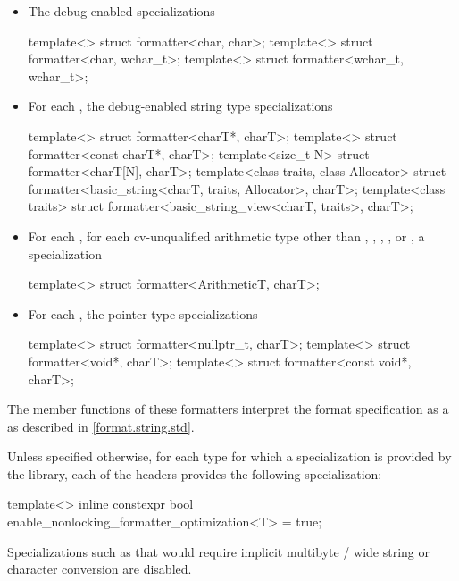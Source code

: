 \begin{itemize}
\item
{}%
The debug-enabled specializations
\begin{codeblock}
template<> struct formatter<char, char>;
template<> struct formatter<char, wchar_t>;
template<> struct formatter<wchar_t, wchar_t>;
\end{codeblock}

\item
{}%
For each ,
the debug-enabled string type specializations
\begin{codeblock}
template<> struct formatter<charT*, charT>;
template<> struct formatter<const charT*, charT>;
template<size_t N> struct formatter<charT[N], charT>;
template<class traits, class Allocator>
  struct formatter<basic_string<charT, traits, Allocator>, charT>;
template<class traits>
  struct formatter<basic_string_view<charT, traits>, charT>;
\end{codeblock}

\item
{}%
For each ,
for each cv-unqualified arithmetic type 
other than
,
,
,
, or
,
a specialization
\begin{codeblock}
template<> struct formatter<ArithmeticT, charT>;
\end{codeblock}

\item
{}%
%
For each ,
the pointer type specializations
\begin{codeblock}
template<> struct formatter<nullptr_t, charT>;
template<> struct formatter<void*, charT>;
template<> struct formatter<const void*, charT>;
\end{codeblock}
\end{itemize}
The  member functions of these formatters
interpret the format specification
as a 
as described in \ref{format.string.std}.

\pnum
Unless specified otherwise, for each type  for which
a  specialization is provided by the library,
each of the headers provides the following specialization:
\begin{codeblock}
template<> inline constexpr bool enable_nonlocking_formatter_optimization<T> = true;
\end{codeblock}
\begin{note}
Specializations such as 
that would require implicit
multibyte / wide string or character conversion are disabled.
\end{note}

